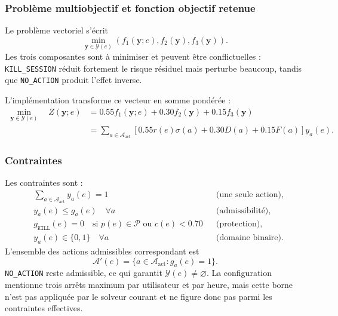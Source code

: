 \documentclass[11pt,a4paper,oneside]{report}
\theoremstyle{definition}
\theoremstyle{plain}
\begin{document}
\subsubsection*{Problème multiobjectif et fonction objectif retenue}

Le problème vectoriel s'écrit
\begin{equation}
\min_{\mathbf{y}\in\mathcal{Y}(e)}
\left(f_1(\mathbf{y};e),f_2(\mathbf{y}),f_3(\mathbf{y})\right).
\label{eq:ai-ro-response-vector}
\end{equation}
Les trois composantes sont à minimiser et peuvent être conflictuelles :
\texttt{KILL\_SESSION} réduit fortement le risque résiduel mais perturbe
beaucoup, tandis que \texttt{NO\_ACTION} produit l'effet inverse.

L'implémentation transforme ce vecteur en somme pondérée :
\begin{align}
\min_{\mathbf{y}\in\mathcal{Y}(e)}\quad
Z(\mathbf{y};e)
&=0.55f_1(\mathbf{y};e)+0.30f_2(\mathbf{y})
+0.15f_3(\mathbf{y})\nonumber\\
&=\sum_{a\in\mathcal{A}_{\mathrm{act}}}
\left[0.55r(e)\sigma(a)+0.30D(a)+0.15F(a)\right]y_a(e).
\label{eq:ai-ro-response-scalar}
\end{align}

\subsubsection*{Contraintes}

Les contraintes sont :
\begin{align}
&\sum_{a\in\mathcal{A}_{\mathrm{act}}}y_a(e)=1
&&\text{(une seule action)},\label{eq:ai-ro-constraint-unique}\\
&y_a(e)\leq g_a(e)\quad\forall a
&&\text{(admissibilité)},\label{eq:ai-ro-constraint-feasible}\\
&g_{\texttt{KILL}}(e)=0
\quad\text{si }p(e)\in\mathcal{P}\text{ ou }c(e)<0.70
&&\text{(protection)},\label{eq:ai-ro-constraint-kill}\\
&y_a(e)\in\{0,1\}\quad\forall a
&&\text{(domaine binaire)}.\label{eq:ai-ro-constraint-binary}
\end{align}
L'ensemble des actions admissibles correspondant est
\begin{equation}
\mathcal{A}'(e)=
\{a\in\mathcal{A}_{\mathrm{act}}:g_a(e)=1\}.
\label{eq:ai-ro-response-feasible}
\end{equation}
\texttt{NO\_ACTION} reste admissible, ce qui garantit
$\mathcal{Y}(e)\neq\varnothing$. La configuration mentionne trois arrêts
maximum par utilisateur et par heure, mais cette borne n'est pas appliquée par
le solveur courant et ne figure donc pas parmi les contraintes effectives.
\end{document}
